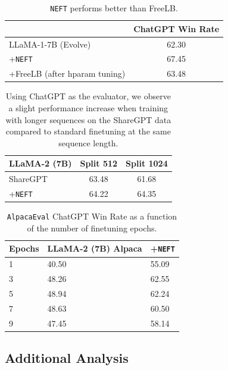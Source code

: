 \documentclass{article} %
\newcommand{\neft}{\texttt{NEFT}}
\newcommand{\llama}{LLaMA}
\begin{document}
\begin{table}[h]
\centering
\caption{\neft{} performs better than FreeLB.} \label{tab:FreeLB_ablation}
\begin{tabular}{lc} \toprule
                              & ChatGPT Win Rate \\ \midrule
\llama{}-1-7B (Evolve) & 62.30            \\
+\neft{}                         & 67.45            \\
+FreeLB (after hparam tuning)   & 63.48           \\ \bottomrule
\end{tabular}
\end{table}


\begin{table}[h!]
    \centering
    \caption{Using ChatGPT as the evaluator, we observe a slight performance increase when training with longer sequences on the ShareGPT data compared to standard finetuning at the same sequence length.}
    \label{tab:ShareGPT_longseq}
    \begin{tabular}{l|cc}\toprule
    \llama{}-2 (7B) & Split 512 & Split 1024 \\ \midrule
    ShareGPT     & 63.48     & 61.68      \\
    +\neft{}   & 64.22     & 64.35     \\ \bottomrule
    \end{tabular}
\end{table}
\begin{table}[h]
\centering
\caption{\texttt{AlpacaEval} ChatGPT Win Rate as a function of the number of finetuning epochs. }\label{tab:Alpaca_Epochs}
\begin{tabular}{lll}
\toprule
Epochs & \llama{}-2 (7B) Alpaca & +\neft{} \\ \midrule
1      & 40.50               & 55.09 \\
3      & 48.26               & 62.55 \\
5      & 48.94               & 62.24 \\
7      & 48.63               & 60.50 \\
9      & 47.45               & 58.14 \\ \bottomrule
\end{tabular}
\end{table}


\subsection{Additional Analysis}
\end{document}
